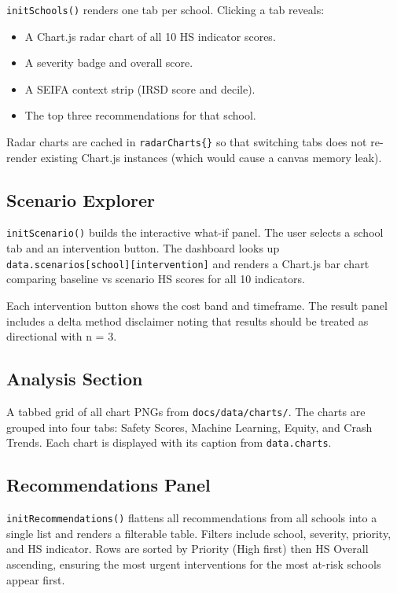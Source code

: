 \documentclass[11pt,a4paper,openany]{book}
\begin{document}
\texttt{initSchools()} renders one tab per school.  Clicking a tab reveals:

\begin{itemize}
  \item A Chart.js radar chart of all 10 HS indicator scores.
  \item A severity badge and overall score.
  \item A SEIFA context strip (IRSD score and decile).
  \item The top three recommendations for that school.
\end{itemize}

Radar charts are cached in \texttt{radarCharts\{\}} so that switching tabs does not
re-render existing Chart.js instances (which would cause a canvas memory leak).

\subsection{Scenario Explorer}

\texttt{initScenario()} builds the interactive what-if panel.  The user selects a school
tab and an intervention button.  The dashboard looks up
\texttt{data.scenarios[school][intervention]} and renders a Chart.js bar chart comparing
baseline vs scenario HS scores for all 10 indicators.

Each intervention button shows the cost band and timeframe.  The result panel includes
a delta method disclaimer noting that results should be treated as directional with n = 3.

\subsection{Analysis Section}

A tabbed grid of all chart PNGs from \texttt{docs/data/charts/}.  The charts are grouped
into four tabs: Safety Scores, Machine Learning, Equity, and Crash Trends.  Each chart
is displayed with its caption from \texttt{data.charts}.

\subsection{Recommendations Panel}

\texttt{initRecommendations()} flattens all recommendations from all schools into a
single list and renders a filterable table.  Filters include school, severity, priority,
and HS indicator.  Rows are sorted by Priority (High first) then HS Overall ascending,
ensuring the most urgent interventions for the most at-risk schools appear first.
\end{document}
